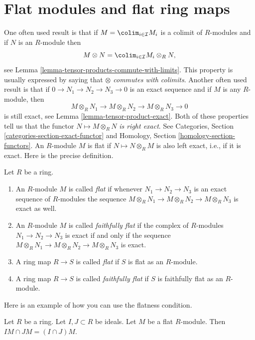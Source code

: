 \section{Flat modules and flat ring maps}
\label{section-flat}

\noindent
One often used result is that if $M = \colim_{i\in \mathcal{I}} M_i$
is a colimit of $R$-modules and if $N$ is an $R$-module then
$$
M \otimes N
=
\colim_{i\in \mathcal{I}} M_i \otimes_R N,
$$
see Lemma \ref{lemma-tensor-products-commute-with-limits}.
This property is usually expressed by saying
that {\it $\otimes$ commutes with colimits}.
Another often used result is that if $0 \to N_1 \to N_2 \to N_3 \to 0$
is an exact sequence and if $M$ is any $R$-module, then
$$
M \otimes_R N_1
\to
M \otimes_R N_2
\to
M \otimes_R N_3
\to
0
$$
is still exact, see Lemma \ref{lemma-tensor-product-exact}.
Both of these properties tell us that the functor
$N \mapsto M \otimes_R N$ {\it is right exact}.
See Categories, Section \ref{categories-section-exact-functor}
and Homology, Section \ref{homology-section-functors}.
An $R$-module $M$ is flat if $N \mapsto N \otimes_R M$ is also left exact,
i.e., if it is exact. Here is the precise definition.

\begin{definition}
\label{definition-flat}
Let $R$ be a ring.
\begin{enumerate}
\item An $R$-module $M$ is called {\it flat} if whenever
$N_1 \to N_2 \to N_3$ is an exact sequence of $R$-modules
the sequence $M \otimes_R N_1 \to M \otimes_R N_2 \to M \otimes_R N_3$
is exact as well.
\item An $R$-module $M$ is called {\it faithfully flat} if the
complex of $R$-modules
$N_1 \to N_2 \to N_3$ is exact if and only if
the sequence $M \otimes_R N_1 \to M \otimes_R N_2 \to M \otimes_R N_3$
is exact.
\item A ring map $R \to S$ is called {\it flat} if
$S$ is flat as an $R$-module.
\item A ring map $R \to S$ is called {\it faithfully flat} if
$S$ is faithfully flat as an $R$-module.
\end{enumerate}
\end{definition}

\noindent
Here is an example of how you can use the flatness condition.

\begin{lemma}
\label{lemma-flat-intersect-ideals}
Let $R$ be a ring. Let $I, J \subset R$ be ideals. Let $M$ be a flat
$R$-module. Then $IM \cap JM = (I \cap J)M$.
\end{lemma}

